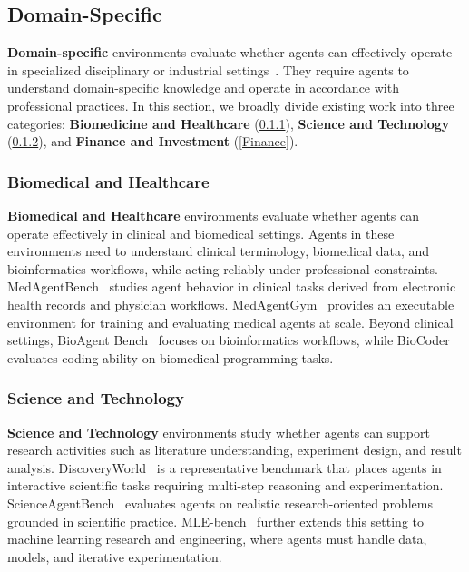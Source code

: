 \subsection{Domain-Specific}
\label{Domain-Specific}
\textbf{Domain-specific} environments evaluate whether agents can effectively operate in specialized disciplinary or industrial settings~\cite{MedAgentBench,MedAgentGym,BioAgent_Bench,Biocoder,DiscoveryWorld,ScienceAgentBench,MLE-bench,StockBench,FinDeepResearch,Finance_Agent_Benchmark}. They require agents to understand domain-specific knowledge and operate in accordance with professional practices. In this section, we broadly divide existing work into three categories: \textbf{Biomedicine and Healthcare} (\cref{Biomedical and Healthcare}), \textbf{Science and Technology} (\cref{Science and Technology}), and \textbf{Finance and Investment} (\cref{Finance}).

\subsubsection{Biomedical and Healthcare}
\label{Biomedical and Healthcare}
\textbf{Biomedical and Healthcare} environments evaluate whether agents can operate effectively in clinical and biomedical settings. Agents in these environments need to understand clinical terminology, biomedical data, and bioinformatics workflows, while acting reliably under professional constraints. MedAgentBench~\cite{MedAgentBench} studies agent behavior in clinical tasks derived from electronic health records and physician workflows. MedAgentGym~\cite{MedAgentGym} provides an executable environment for training and evaluating medical agents at scale. Beyond clinical settings, BioAgent Bench~\cite{BioAgent_Bench} focuses on bioinformatics workflows, while BioCoder~\cite{Biocoder} evaluates coding ability on biomedical programming tasks. 

\subsubsection{Science and Technology}
\label{Science and Technology}
\textbf{Science and Technology} environments study whether agents can support research activities such as literature understanding, experiment design, and result analysis. DiscoveryWorld~\cite{DiscoveryWorld} is a representative benchmark that places agents in interactive scientific tasks requiring multi-step reasoning and experimentation. ScienceAgentBench~\cite{ScienceAgentBench} evaluates agents on realistic research-oriented problems grounded in scientific practice. MLE-bench~\cite{MLE-bench} further extends this setting to machine learning research and engineering, where agents must handle data, models, and iterative experimentation.

